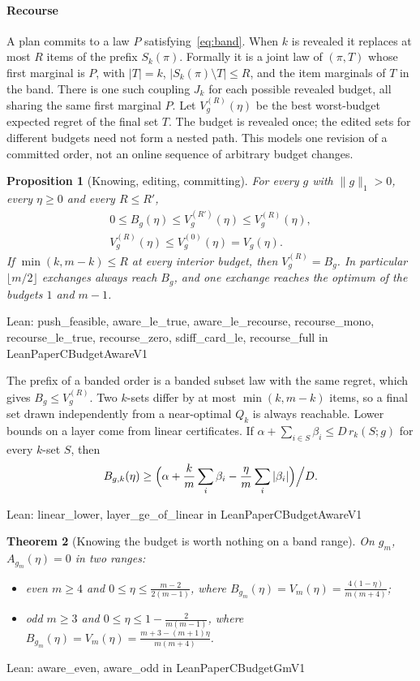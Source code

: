 \documentclass[conference]{IEEEtran}
\newtheorem{theorem}{Theorem}
\newtheorem{proposition}[theorem]{Proposition}
\theoremstyle{definition}
\newcommand{\lean}[1]{\textsf{\footnotesize #1}}
\newcommand{\leanbox}[1]{%
  \par\vspace{2pt}\noindent
  {\raggedright\footnotesize\textsf{Lean: #1}\par}\vspace{2pt}}
\begin{document}
\paragraph{Recourse} A plan commits to a law $P$ satisfying~\eqref{eq:band}. When $k$ is
revealed it replaces at most $R$ items of the prefix $S_{k}(\pi)$. Formally it is a joint law
of $(\pi,T)$ whose first marginal is $P$, with $|T|=k$, $|S_{k}(\pi)\setminus T|\le R$, and the
item marginals of $T$ in the band. There is one such coupling $J_k$ for each possible
revealed budget, all sharing the same first marginal $P$. Let $V^{(R)}_{g}(\eta)$ be the best
worst-budget expected regret of the final set $T$. The budget is revealed once; the edited
sets for different budgets need not form a nested path. This models one revision of a
committed order, not an online sequence of arbitrary budget changes.

\begin{proposition}[Knowing, editing, committing]
\label{prop:sandwich}
For every $g$ with $\|g\|_1>0$, every $\eta\ge0$ and every $R\le R'$,
\begin{gather*}
0\le B_g(\eta)\le V^{(R')}_g(\eta)\le V^{(R)}_g(\eta),\\
V^{(R)}_g(\eta)\le V^{(0)}_g(\eta)=V_g(\eta).
\end{gather*}
If $\min(k,m-k)\le R$ at every interior budget, then $V^{(R)}_{g}=B_{g}$. In particular
$\lfloor m/2\rfloor$ exchanges always reach $B_{g}$, and one exchange reaches the optimum of the
budgets $1$ and $m-1$.
\end{proposition}
\leanbox{\lean{push\_feasible}, \lean{aware\_le\_true}, \lean{aware\_le\_recourse},
\lean{recourse\_mono}, \lean{recourse\_le\_true}, \lean{recourse\_zero}, \lean{sdiff\_card\_le},
\lean{recourse\_full} in \lean{LeanPaperCBudgetAwareV1}}

The prefix of a banded order is a banded subset law with the same regret, which gives
$B_g\le V^{(R)}_g$. Two $k$-sets differ by at most $\min(k,m-k)$ items, so a final set drawn
independently from a near-optimal $Q_{k}$ is always reachable. Lower bounds on a layer come
from linear certificates. If $\alpha+\sum_{i\in S}\beta_{i}\le D\,r_{k}(S;g)$ for every $k$-set
$S$, then
\[
B_{g,k}(\eta)\ge\Bigl(\alpha+\frac km\sum_{i}\beta_{i}-\frac\eta m\sum_{i}|\beta_{i}|\Bigr)\Big/D.
\]
\leanbox{\lean{linear\_lower}, \lean{layer\_ge\_of\_linear} in \lean{LeanPaperCBudgetAwareV1}}

\begin{theorem}[Knowing the budget is worth nothing on a band range]
\label{thm:zerovalue}
On $g_{m}$, $A_{g_m}(\eta)=0$ in two ranges:
\begin{itemize}
\item even $m\ge4$ and $0\le\eta\le\frac{m-2}{2(m-1)}$, where
$B_{g_m}(\eta)=V_{m}(\eta)=\frac{4(1-\eta)}{m(m+4)}$;
\item odd $m\ge3$ and $0\le\eta\le1-\frac{2}{m(m-1)}$, where
$B_{g_m}(\eta)=V_{m}(\eta)=\frac{m+3-(m+1)\eta}{m(m+4)}$.
\end{itemize}
\end{theorem}
\leanbox{\lean{aware\_even}, \lean{aware\_odd} in \lean{LeanPaperCBudgetGmV1}}
\end{document}
